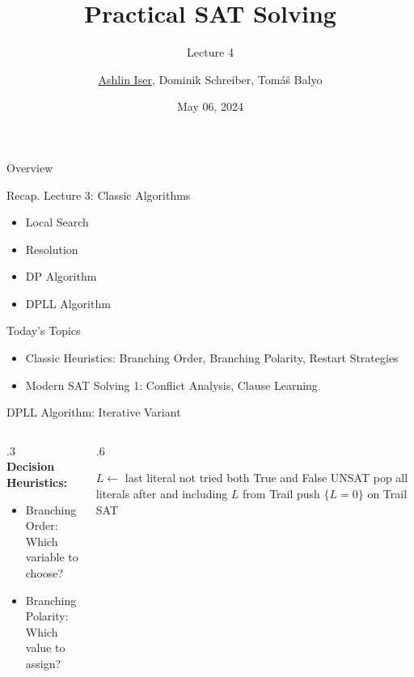 \documentclass[t]{sdqbeamer}
\title[SAT Solving]{Practical SAT Solving}
\subtitle{Lecture 4}
\author{\underline{Ashlin Iser}, Dominik Schreiber, Tom\'a\v{s} Balyo}
\date{May 06, 2024}
\begin{document}
\begin{frame}
	\thispagestyle{empty}
	\titlepage
\end{frame}

\begin{frame}{Overview}
	\begin{block}{Recap. Lecture 3: Classic Algorithms}
		\begin{itemize}\setlength{\itemsep}{1ex}
			\item Local Search
			\item Resolution
			\item DP Algorithm
			\item DPLL Algorithm
		\end{itemize}
	\end{block}
	\pause
	\begin{block}{Today's Topics}
		\begin{itemize}\setlength{\itemsep}{1ex}
			\item Classic Heuristics: Branching Order, Branching Polarity, Restart Strategies
			\item Modern SAT Solving 1: Conflict Analysis, Clause Learning
		\end{itemize}
	\end{block}
\end{frame}

\begin{frame}{DPLL Algorithm: Iterative Variant}\begin{block}{}
\begin{columns}[T]
\begin{column}{.3\linewidth}
~\\[1em]
\textbf{Decision Heuristics:}~\\[1em]
\begin{itemize}\setlength{\itemsep}{1em}
	\item Branching Order:\\[1ex] Which variable to choose?
	\item Branching Polarity:\\[1ex] Which value to assign?
\end{itemize}
\end{column}
\begin{column}{.6\linewidth}
\begin{algorithm}[H]
\DontPrintSemicolon
\caption{iterativeDPLL(CNF Formula $F$)}
\BlankLine

 {
	 {
		$L \leftarrow$ last literal not tried both True and False\;
		 {\Return UNSAT}
		pop all literals after and including $L$ from Trail\;
		push $\{ L = 0 \}$ on Trail\;
	}
}
\Return SAT\;
\end{algorithm}
\end{column}
\end{columns}
\end{block}
\end{frame}
\end{document}
